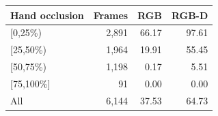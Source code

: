 \begin{tabular}{lrrr}
\toprule
Hand occlusion & Frames & RGB & RGB-D \\
\midrule
{[0,25\%)} & 2,891 & 66.17 & 97.61 \\
{[25,50\%)} & 1,964 & 19.91 & 55.45 \\
{[50,75\%)} & 1,198 & 0.17 & 5.51 \\
{[75,100\%]} & 91 & 0.00 & 0.00 \\
\midrule
All & 6,144 & 37.53 & 64.73 \\
\bottomrule
\end{tabular}
